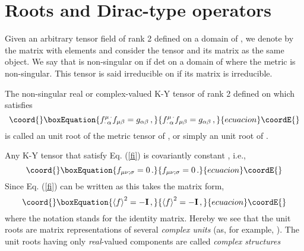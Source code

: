 \documentclass[a4paper,12pt]{article}
\begin{document}
\section{Roots and Dirac-type operators}

Given \myHighlight{$\xi$}\coordHE{} an arbitrary tensor field of rank 2  defined on a domain of \coordHE{}, 
we denote by \myHighlight{$\left<\xi\right>$}\coordHE{} the matrix with 
elements \myHighlight{$\xi^{\mu\,\cdot}_{\cdot\,\nu}$}\coordHE{} and consider the tensor and its 
matrix as the same object. We say that \myHighlight{$\xi$}\coordHE{} is non-singular on 
\coordHE{} if det\coordHE{}  on a domain of \coordHE{} where the metric 
is non-singular. This tensor is said irreducible on \coordHE{} if its matrix is 
irreducible. 
\begin{defin}\label{Def1} 
The  non-singular real or complex-valued K-Y tensor \coordHE{} of rank 2 defined on 
\coordHE{} which satisfies
\begin{equation}\coord{}\boxEquation{\label{fi}
f^{\mu\,\cdot}_{\cdot\,\alpha} f_{\mu\beta}=g_{\alpha\beta}\,,
}{f^{\mu\,\cdot}_{\cdot\,\alpha} f_{\mu\beta}=g_{\alpha\beta}\,,
}{ecuacion}\coordE{}\end{equation}
is called an unit root of the metric tensor of \coordHE{}, or simply an unit root 
of \coordHE{}.  
\end{defin}
Any K-Y tensor that satisfy Eq. (\ref{fi}) is covariantly constant \cite{K2}, 
i.e.,
\begin{equation}\coord{}\boxEquation{\label{cc}
f_{\mu\nu;\sigma}=0\,.
}{f_{\mu\nu;\sigma}=0\,.
}{ecuacion}\coordE{}\end{equation}  
Since Eq. (\ref{fi}) can be written as
\coordHE{} 
this takes the matrix form,   
\begin{equation}\coord{}\boxEquation{\label{f2I}
\left<f\right>^2=-{\bf  I}\,,
}{\left<f\right>^2=-{\bf  I}\,,
}{ecuacion}\coordE{}\end{equation}
where the notation \coordHE{} stands for the \coordHE{} identity matrix.
Hereby we see that the unit roots are matrix representations of several 
{\em complex units} (as, for example, \coordHE{}). The unit roots having 
only {\em real}-valued components are called {\em complex structures}  
\end{document}
